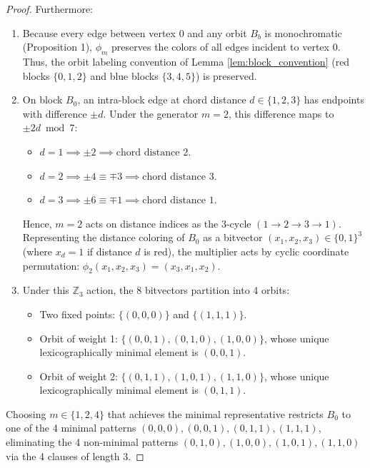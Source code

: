 \documentclass[11pt,a4paper]{article}
\theoremstyle{definition}
\begin{document}
\begin{proof}
Furthermore:
\begin{enumerate}
    \item Because every edge between vertex 0 and any orbit $B_b$ is monochromatic (Proposition 1), $\phi_m$ preserves the colors of all edges incident to vertex 0. Thus, the orbit labeling convention of Lemma \ref{lem:block_convention} (red blocks $\{0,1,2\}$ and blue blocks $\{3,4,5\}$) is preserved.
    \item On block $B_0$, an intra-block edge at chord distance $d \in \{1, 2, 3\}$ has endpoints with difference $\pm d$. Under the generator $m = 2$, this difference maps to $\pm 2d \bmod 7$:
    \begin{itemize}
        \item $d = 1 \implies \pm 2 \implies \text{chord distance } 2$.
        \item $d = 2 \implies \pm 4 \equiv \mp 3 \implies \text{chord distance } 3$.
        \item $d = 3 \implies \pm 6 \equiv \mp 1 \implies \text{chord distance } 1$.
    \end{itemize}
    Hence, $m = 2$ acts on distance indices as the 3-cycle $(1 \to 2 \to 3 \to 1)$. Representing the distance coloring of $B_0$ as a bitvector $(x_1, x_2, x_3) \in \{0, 1\}^3$ (where $x_d = 1$ if distance $d$ is red), the multiplier acts by cyclic coordinate permutation: $\phi_2(x_1, x_2, x_3) = (x_3, x_1, x_2)$.
    \item Under this $\mathbb{Z}_3$ action, the 8 bitvectors partition into 4 orbits:
    \begin{itemize}
        \item Two fixed points: $\{(0,0,0)\}$ and $\{(1,1,1)\}$.
        \item Orbit of weight 1: $\{(0,0,1), (0,1,0), (1,0,0)\}$, whose unique lexicographically minimal element is $(0,0,1)$.
        \item Orbit of weight 2: $\{(0,1,1), (1,0,1), (1,1,0)\}$, whose unique lexicographically minimal element is $(0,1,1)$.
    \end{itemize}
\end{enumerate}
Choosing $m \in \{1, 2, 4\}$ that achieves the minimal representative restricts $B_0$ to one of the 4 minimal patterns $(0,0,0), (0,0,1), (0,1,1), (1,1,1)$, eliminating the 4 non-minimal patterns $(0,1,0), (1,0,0), (1,0,1), (1,1,0)$ via the 4 clauses of length 3.
\end{proof}
\end{document}
